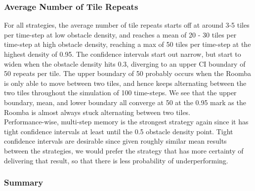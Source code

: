 \documentclass[11pt]{article}
\begin{document}
\subsubsection*{Average Number of Tile Repeats}

For all strategies, the average number of tile repeats starts off at
around 3-5 tiles per time-step at low obstacle density, and reaches a
mean of 20 - 30 tiles per time-step at high obstacle density, reaching a
max of 50 tiles per time-step at the highest density of 0.95. The
confidence intervals start out narrow, but start to widen when the
obstacle density hits 0.3, diverging to an upper CI boundary of 50
repeats per tile. The upper boundary of 50 probably occurs when the
Roomba is only able to move between two tiles, and hence keeps
alternating between the two tiles throughout the simulation of 100
time-steps. We see that the upper boundary, mean, and lower boundary all
converge at 50 at the 0.95 mark as the Roomba is almost always stuck
alternating between two tiles.\\

Performance-wise, multi-step memory is the strongest strategy again
since it has tight confidence intervals at least until the 0.5 obstacle
density point. Tight confidence intervals are desirable since given
roughly similar mean results between the strategies, we would prefer the
strategy that has more certainty of delivering that result, so that
there is less probability of underperforming.

\subsubsection{Summary}
\end{document}
